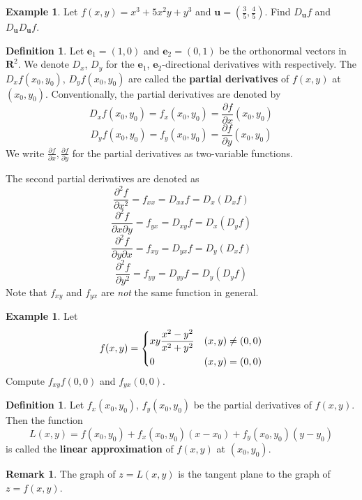\documentclass{beamer}
\theoremstyle{plain}
\theoremstyle{definition}
\newtheorem{defn}[thm]{Definition}
\newtheorem{exmp}[thm]{Example}
\newtheorem{rem}[thm]{Remark}
\begin{document}
\begin{frame}
\begin{exmp}
	Let $f(x,y)=x^3+5x^2y+y^3$ 
	and $\mathbf u=(\frac{3}{5},\frac{4}{5})$.
	Find $D_{\mathbf u}f$ and 
	$D_{\mathbf u}D_{\mathbf u} f$.
\end{exmp}
\end{frame}

\begin{frame}	
\begin{defn}
	Let $\mathbf e_1=(1,0)$ and $\mathbf e_2=(0,1)$ 
	be the orthonormal vectors in $\mathbf R^2$.
	We denote $D_x$, $D_y$ for the 
	$\mathbf e_1$, $\mathbf e_2$-directional derivatives
	with respectively.
	The $D_xf(x_0,y_0)$, $D_yf(x_0,y_0)$ are called 
	the \textbf{partial derivatives} of $f(x,y)$ 
	at $(x_0,y_0)$.
	Conventionally, the partial derivatives are 
	denoted by
	$$D_xf(x_0,y_0) = f_x(x_0,y_0)
	 = \frac{\partial f}{\partial x}(x_0,y_0)$$
	$$D_yf(x_0,y_0) = f_y(x_0,y_0)
	 = \frac{\partial f}{\partial y}(x_0,y_0)$$
	We write $\displaystyle 
	\frac{\partial f}{\partial x},
	\frac{\partial f}{\partial y}$ 
	for the partial derivatives as 
	two-variable functions.
\end{defn}
\end{frame}

\begin{frame}
The second partial derivatives are denoted as
	$$\frac{\partial^2f}{\partial x^2}
	 = f_{xx}=D_{xx}f=D_x(D_xf)$$
	$$\frac{\partial^2f}{\partial x\partial y}
	 = f_{yx}=D_{xy}f=D_x(D_yf)$$
	$$\frac{\partial^2f}{\partial y\partial x}
	 = f_{xy}=D_{yx}f=D_y(D_xf)$$
	$$\frac{\partial^2f}{\partial y^2}=f_{yy}
	 = D_{yy}f=D_y(D_yf)$$
Note that $f_{xy}$ and $f_{yx}$ are \emph{not}
the same function in general.
\end{frame}

\begin{frame}
\begin{exmp}
Let 
	$$f(x,y)=\begin{dcases}
	xy\frac{x^2-y^2}{x^2+y^2}&(x,y)\neq(0,0)\\
	0& (x,y)=(0,0)
	\end{dcases}$$
Compute $f_{xy}f(0,0)$ and $f_{yx}(0,0)$.
\end{exmp}
\end{frame}

\begin{frame}
\begin{defn}
	Let $f_x(x_0,y_0)$, $f_y(x_0,y_0)$ 
	be the partial derivatives of $f(x,y)$.
	Then the function
	$$L(x,y) = f(x_0,y_0) + f_x(x_0,y_0)(x-x_0)
		+ f_y(x_0,y_0)(y-y_0)$$
	is called the \textbf{linear approximation} of 
	$f(x,y)$ at $(x_0,y_0)$.
\end{defn}
\begin{rem}
	The graph of $z=L(x,y)$ is the tangent plane
	to the graph of $z=f(x,y)$.
\end{rem}
\end{frame}
\end{document}
